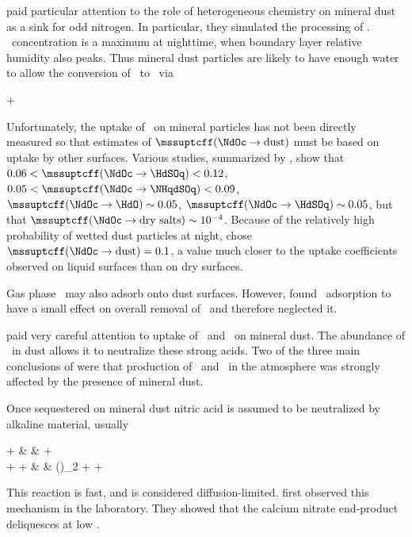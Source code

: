 \documentclass[12pt,twoside]{book}
\newcounter{reaction} %
\begin{document}
\cite{DCZ96} paid particular attention to the role of heterogeneous
chemistry on mineral dust as a sink for odd nitrogen.
In particular, they simulated the processing of \NdOc.
\NdOc\ concentration is a maximum at nighttime, when boundary layer
relative humidity also peaks.
Thus mineral dust particles are likely to have enough water to allow
the conversion of \NdOc\ to \HNOt\ via
\begin{reaction}
\NdOc + \HdO {}\HNOt %
\label{rxn:chm_NO3}
\end{reaction}
Unfortunately, the uptake of \NdOc\ on mineral particles has not been
directly measured so that estimates of 
$\mssuptcff(\NdOc \rightarrow \mbox{dust})$ must be based on uptake by
other surfaces.
Various studies, summarized by \cite{DCZ96}, show that
$0.06 < \mssuptcff(\NdOc \rightarrow \HdSOq) < 0.12$, 
$0.05 < \mssuptcff(\NdOc \rightarrow \NHqdSOq) < 0.09$, 
$\mssuptcff(\NdOc \rightarrow \HdO) \sim 0.05$, 
$\mssuptcff(\NdOc \rightarrow \HdSOq) \sim 0.05$, but that
$\mssuptcff(\NdOc \rightarrow \mbox{dry salts}) \sim 10^{-4}$.
Because of the relatively high probability of wetted dust particles at
night, \cite{DCZ96} chose 
$\mssuptcff(\NdOc \rightarrow \mbox{dust}) = 0.1$, a value much closer
to the uptake coefficients observed on liquid surfaces than on dry
surfaces. 

Gas phase \NOt\ may also adsorb onto dust surfaces. 
However, \cite{DCZ96} found \NOt\ adsorption to have a small effect on
overall removal of \NOx\ and therefore neglected it.

\cite{DCZ96} paid very careful attention to uptake of \HNOt\ and \SOd\
on mineral dust.
The abundance of \CaCOt\ in dust allows it to neutralize these strong
acids.
Two of the three main conclusions of \cite{DCZ96} were that production
of \SOqdm\ and \NOtm\ in the atmosphere was strongly affected by the
presence of mineral dust.

Once sequestered on mineral dust nitric acid is assumed to be
neutralized by alkaline material, usually \CaCOt\ \cite[]{DCZ96}
\begin{rxnarray}
\HNOt + \CaCOt & \yields & \Cadp\NOtm + \HCOtm \\ %
\HNOt + \Cadp\NOtm + \HCOtm & \yields & \Ca(\NOt)_{2} + \HdO + \COd %
\label{rxn:chm_HNO3}
\end{rxnarray}
This reaction is fast, and is considered diffusion-limited.  
\cite{KGL03} first observed this mechanism in the laboratory.
They showed that the calcium nitrate end-product deliquesces at low \RH\@. 
\end{document}
